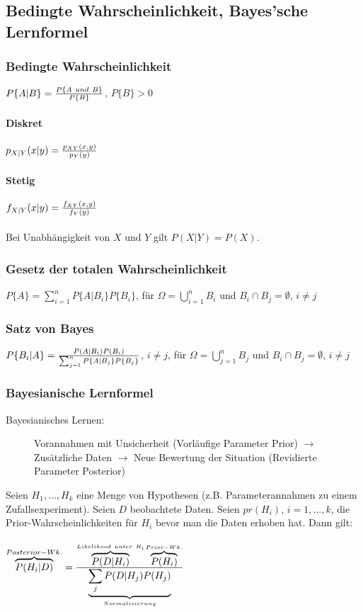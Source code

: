 \subsection{Bedingte Wahrscheinlichkeit, Bayes'sche Lernformel}
\subsubsection{Bedingte Wahrscheinlichkeit}
$ P\{ A|B \} = { P\{ A ~ und ~ B \} \over P\{ B \}} $, $ P\{ B \} > 0 $
\paragraph{Diskret}
$ p_{X|Y}(x|y) = { p_{XY}(x,y) \over p_Y(y)} $
\paragraph{Stetig}
$ f_{X|Y}(x|y) = { f_{XY}(x,y) \over f_Y(y)} $ \\\\
Bei Unabhängigkeit von $X$ und $Y$ gilt $ P(X|Y) = P(X) $.

\subsubsection{Gesetz der totalen Wahrscheinlichkeit}
$ P\{ A \} = \sum_{i=1}^n P \{ A|B_i \}P\{ B_i \} $, für $ \Omega = \bigcup_{i=1}^n B_i $ und $ B_i \cap B_j = \emptyset $, $ i \neq j $

\subsubsection{Satz von Bayes}
$ P\{ B_i | A \} = {P(A|B_i) P(B_i) \over \sum_{j=1}^n P\{ A | B_j \} P\{ B_j \} } $, $ i \neq j $, für $ \Omega = \bigcup_{j=1}^n B_j $ und $ B_i \cap B_j = \emptyset $, $ i \neq j $

\subsubsection{Bayesianische Lernformel}
\begin{description}
 \item[Bayesianisches Lernen:] Vorannahmen mit Unsicherheit (Vorläufige Parameter \textendash{} Prior) $\rightarrow$ Zusätzliche Daten $\rightarrow$ Neue Bewertung der Situation (Revidierte Parameter \textendash{} Posterior)
\end{description}

Seien $ H_1, \dots, H_k $ eine Menge von Hypothesen (z.B. Parameterannahmen zu einem Zufallsexperiment). Seien $D$ beobachtete Daten. Seien $ pr(H_i) $, $ i=1, \dots, k $, die Prior-Wahrscheinlichkeiten für $H_i$ bevor man die Daten erhoben hat. Dann gilt: \\\\
$ \overbrace{P(H_i|D)}^{Posterior-Wk.} = { \overbrace{P(D|H_i)}^{Likelihood ~ unter ~ H_i} \overbrace{P(H_i)}^{Prior-Wk.} \over \underbrace{\sum_j P(D|H_j) P(H_j)}_{Normalisierung}} $

